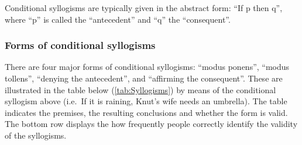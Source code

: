 \documentclass[
]{krantz}
\begin{document}
Conditional syllogisms are typically given in the abstract form: ``If p then q'', where ``p'' is called the ``antecedent'' and ``q'' the ``consequent''.

\subsubsection*{Forms of conditional syllogisms}\label{forms-of-conditional-syllogisms}


There are four major forms of conditional syllogisms: ``modus ponens'', ``modus tollens'', ``denying the antecedent'', and ``affirming the consequent''. These are illustrated in the table below (\ref{tab:Syllogisms}) by means of the conditional syllogism above (i.e.~If it is raining, Knut's wife needs an umbrella). The table indicates the premises, the resulting conclusions and whether the form is valid. The bottom row displays the how frequently people correctly identify the validity of the syllogisms.
\end{document}
